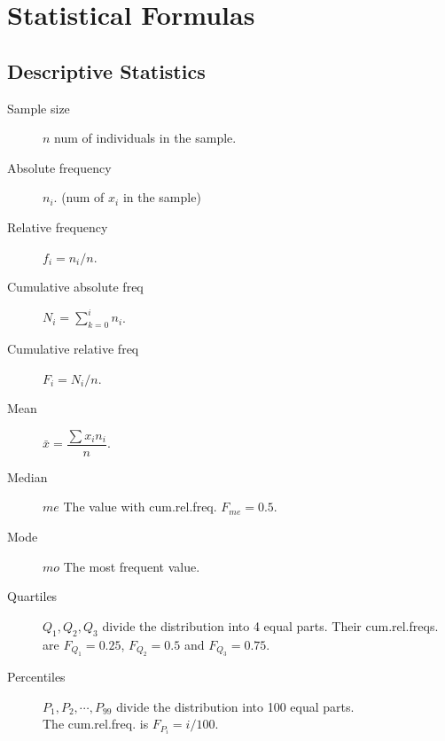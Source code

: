 \documentclass[a4paper, 10pt]{article}
\begin{document}
\sloppy
\section*{\sffamily\huge\color{color1} Statistical Formulas}

\footnotesize
{}
\subsection*{\sffamily Descriptive Statistics}
\begin{multicols}{2}
\begin{tcolorbox}[hbox, title=Frequencies]
\begin{varwidth}{0.4\textwidth}
	\begin{description}
		\item [Sample size] $n$ num of individuals in the sample.
	\end{description}
	\begin{description}
		\item [Absolute frequency] $n_i$. (num of $x_i$ in the sample)
		\item [Relative frequency] $f_i=n_i/n$.
		\item [Cumulative absolute freq] $N_i=\sum_{k=0}^in_i$.
		\item [Cumulative relative freq] $F_i=N_i/n$.
	\end{description}
\end{varwidth}
\end{tcolorbox}

\medskip

\begin{tcolorbox}[hbox, title=Central tendency statistics]
\begin{varwidth}{0.4\textwidth}
	\begin{description}
		\item [Mean] $\bar{x}=\dfrac{\sum x_in_i}{n}$.
		\item [Median] $me$ The value with cum.rel.freq. $F_{me}=0.5$.
		\item [Mode] $mo$ The most frequent value.
	\end{description}
\end{varwidth}
\end{tcolorbox}

\medskip

\begin{tcolorbox}[hbox, title=Position statistics]
\begin{varwidth}{0.4\textwidth}
	\begin{description}
		\item [Quartiles] $Q_1,Q_2,Q_3$ divide the distribution into 4 equal parts.
		Their cum.rel.freqs. are
		$F_{Q_1}=0.25$, $F_{Q_2}=0.5$ and $F_{Q_3}=0.75$.
		\item [Percentiles] $P_1,P_2,\cdots,P_{99}$ divide the distribution into 100 equal parts.\\
		The cum.rel.freq. is $F_{P_i}=i/100$.
	\end{description}
\end{varwidth}
\end{tcolorbox}


\end{multicols}
\end{document}
